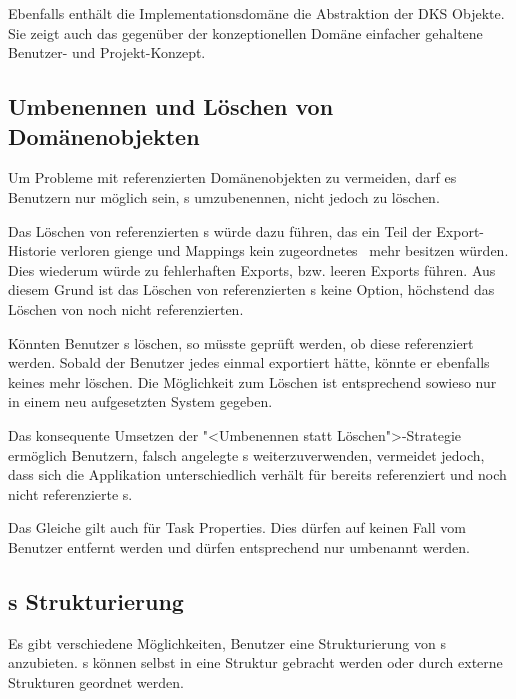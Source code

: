 			Ebenfalls enthält die Implementationsdomäne die Abstraktion der DKS Objekte.
			Sie zeigt auch das gegenüber der konzeptionellen Domäne einfacher gehaltene Benutzer- und Projekt-Konzept.
			
			
		\subsection{Umbenennen und Löschen von Domänenobjekten}
			Um Probleme mit referenzierten Domänenobjekten zu vermeiden,
			darf es Benutzern nur möglich sein, \ttpl s umzubenennen,
			nicht jedoch zu löschen.			

			Das Löschen von referenzierten \ttpl s würde dazu führen, 
			das ein Teil der Export-Historie verloren gienge und Mappings kein zugeordnetes \ttpl\ mehr besitzen würden.
			 Dies wiederum würde zu fehlerhaften Exports, bzw. leeren Exports führen.
			 Aus diesem Grund ist das Löschen von referenzierten \ttpl s keine Option, höchstend das Löschen von noch nicht referenzierten.			
			
			Könnten Benutzer \ttpl s löschen, so müsste geprüft werden, 
			ob diese referenziert werden. Sobald der Benutzer jedes \ttpl einmal exportiert hätte, könnte er ebenfalls keines mehr löschen.
			Die Möglichkeit zum Löschen ist entsprechend sowieso nur in einem neu aufgesetzten System gegeben.
			
			Das konsequente Umsetzen der "<Umbenennen statt Löschen">-Strategie ermöglich Benutzern, 
			falsch angelegte \ttpl s weiterzuverwenden, vermeidet jedoch, 
			dass sich die Applikation unterschiedlich verhält für bereits referenziert und noch nicht referenzierte \ttpl s.
			
			Das Gleiche gilt auch für Task Properties.
			Dies dürfen auf keinen Fall vom Benutzer entfernt werden 
			und dürfen entsprechend nur umbenannt werden.
			
		
		\subsection{\ttpl s Strukturierung}
			Es gibt verschiedene Möglichkeiten, 
			Benutzer eine Strukturierung von \ttpl s anzubieten.
			\ttpl s können selbst in eine Struktur gebracht werden
			oder durch externe Strukturen geordnet werden.
		
